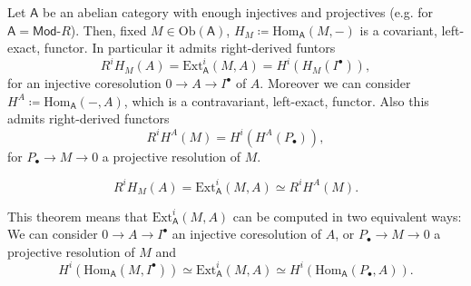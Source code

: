 \begin{rem}[]
	Let $\mathsf{A}$ be an abelian category with enough injectives and projectives (e.g. for
	$\mathsf{A} = \mathsf{Mod}\text{-}R$).
	Then, fixed $M \in \mathrm{Ob} \left(\mathsf{A}\right)$, $H_M \coloneqq \mathrm{Hom}_{\mathsf{A}} \left( M, - \right)$
	is a covariant, left-exact, functor.
	In particular it admits right-derived funtors
	\begin{equation}
		R^iH_M(A) = \mathrm{Ext}^i_{\mathsf{A}} \left( M, A \right) =
		H^i \left( H_M (I^\bullet) \right)
	,\end{equation} 
	for an injective coresolution $0 \to A \to I^\bullet$ of $A$.
	Moreover we can consider $H^A \coloneqq \mathrm{Hom}_{\mathsf{A}} \left( -, A \right)$, which
	is a contravariant, left-exact, functor.
	Also this admits right-derived functors
	\begin{equation}
		R^iH^A(M) = H^i \left( H^A(P_{\bullet}) \right)
	,\end{equation} 
	for $P_{\bullet} \to M \to 0$ a projective resolution of $M$.
\end{rem}

\begin{thm}
	\begin{equation}
		R^i H_M(A) = \mathrm{Ext}^i_{\mathsf{A}}(M,A)\simeq R^i H^A (M)
	.\end{equation} 
\end{thm}

\begin{rem}[Consequence]
	This theorem means that $\mathrm{Ext}^i_{\mathsf{A}}(M,A)$
	can be computed in two equivalent ways:
	We can consider $0 \to A \to I^\bullet$ an injective coresolution of $A$,
	or $P_{\bullet} \to M \to 0$ a projective resolution of $M$
	and
	\begin{equation}
		H^i \left( \mathrm{Hom}_{\mathsf{A}} \left( M, I^\bullet \right) \right) \simeq
		\mathrm{Ext}^i_{\mathsf{A}} (M,A) \simeq
		H^i \left( \mathrm{Hom}_{\mathsf{A}} \left( P_{\bullet}, A \right) \right)
	.\end{equation} 
\end{rem}

